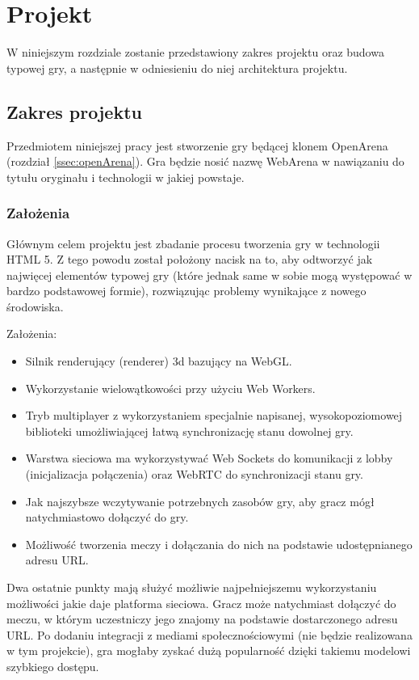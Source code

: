 \chapter{Projekt}
\label{cha:projekt}
W niniejszym rozdziale zostanie przedstawiony zakres projektu oraz
budowa typowej gry, a następnie w odniesieniu do niej
architektura projektu.

\section{Zakres projektu}
\label{sec:zakresProjektu}

Przedmiotem niniejszej pracy jest stworzenie gry będącej klonem OpenArena
(rozdział \ref{ssec:openArena}). Gra będzie nosić nazwę WebArena w nawiązaniu do tytułu
oryginału i technologii w jakiej powstaje.

\subsection {Założenia}

Głównym celem projektu jest zbadanie procesu tworzenia gry w technologii HTML 5. Z tego
powodu został położony nacisk na to, aby odtworzyć jak najwięcej elementów
typowej gry (które jednak same w sobie mogą występować w bardzo podstawowej formie),
rozwiązując problemy wynikające z nowego środowiska.

Założenia:
\begin{itemize}
\item Silnik renderujący (renderer) 3d bazujący na WebGL.
\item Wykorzystanie wielowątkowości przy użyciu Web Workers.
\item Tryb multiplayer z wykorzystaniem specjalnie napisanej, wysokopoziomowej
  biblioteki umożliwiającej łatwą synchronizację stanu dowolnej gry.
\item Warstwa sieciowa ma wykorzystywać Web Sockets do komunikacji z lobby
  (inicjalizacja połączenia) oraz WebRTC do synchronizacji stanu gry.
\item Jak najszybsze wczytywanie potrzebnych zasobów gry, aby gracz mógł
  natychmiastowo dołączyć do gry.
\item Możliwość tworzenia meczy i dołączania do nich na podstawie udostępnianego
  adresu URL.
\end{itemize}

Dwa ostatnie punkty mają służyć możliwie najpełniejszemu wykorzystaniu możliwości jakie
daje platforma sieciowa. Gracz może natychmiast dołączyć do meczu, w którym uczestniczy jego znajomy
na podstawie dostarczonego adresu URL. Po dodaniu integracji z mediami społecznościowymi
(nie będzie realizowana w tym projekcie), gra mogłaby zyskać dużą popularność dzięki
takiemu modelowi szybkiego dostępu.


